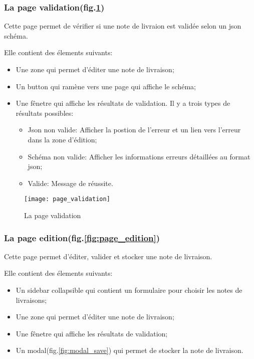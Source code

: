 \subsubsection{La page validation(fig.\ref{fig:page_validation})}
Cette page permet de vérifier si une note de livraion est validée selon un json schéma.

Elle contient des élements suivants:
\begin{itemize}
 \item Une zone qui permet d'éditer une note de livraison;
 \item Un button qui ramène vers une page qui affiche le schéma;
 \item Une fênetre qui affiche les résultats de validation. Il y a trois types de résultats possibles:
       \begin{itemize}
        \item Json non valide: Afficher la postion de l'erreur et un lien vers l'erreur dans la zone d'édition;
        \item Schéma non valide: Afficher les informations erreurs détaillées au format json;
        \item Valide: Message de réussite.
       \end{itemize}
\end{itemize}

\begin{figure}[ht]
 \centering
 \texttt{[image: page\_validation]}
 \caption{La page validation}
 \label{fig:page_validation}
\end{figure}

\subsubsection{La page edition(fig.\ref{fig:page_edition})}
Cette page permet d'éditer, valider et stocker une note de livraison.

Elle contient des élements suivants:
\begin{itemize}
 \item Un sidebar collapsible qui contient un formulaire pour choisir les notes de livraisons;
 \item Une zone qui permet d'éditer une note de livraison;
 \item Une fênetre qui affiche les résultats de validation;
 \item Un modal(fig.\ref{fig:modal_save}) qui permet de stocker la note de livraison.
\end{itemize}

